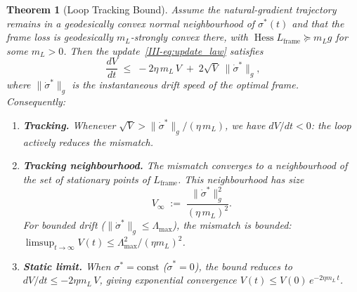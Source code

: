 \documentclass[12pt,a4paper,openany]{book}
\newtheorem{theorem}{Theorem}[chapter]
\begin{document}
\begin{theorem}[Loop Tracking Bound]
\label{III-thm:loop_stability}
Assume the natural-gradient trajectory remains in a geodesically convex
normal neighbourhood of $\sigma^*(t)$ and that the frame loss is
geodesically $m_L$-strongly convex there, with
$\operatorname{Hess}L_{\mathrm{frame}}\succeq m_L g$ for some
$m_L>0$.  Then the update~\eqref{III-eq:update_law} satisfies
\begin{equation}
\label{III-eq:lyapunov_decrease}
\frac{dV}{dt}
\;\leq\; -2\eta\,m_L\,V
\;+\; 2\sqrt{V}\;\bigl\|\dot{\sigma}^*\bigr\|_g,
\end{equation}
where $\|\dot{\sigma}^*\|_g$ is the instantaneous drift speed
of the optimal frame.
Consequently:
\begin{enumerate}
\item[\textup{(a)}] \textbf{Tracking.}
  Whenever $\sqrt{V} >
  \|\dot{\sigma}^*\|_g / (\eta\,m_L)$,
  we have $dV/dt < 0$: the loop actively reduces the
  mismatch.
\item[\textup{(b)}] \textbf{Tracking neighbourhood.}
  The mismatch converges to a neighbourhood of the set
  of stationary points of $L_{\mathrm{frame}}$.
  This neighbourhood has size
  \begin{equation}
  \label{III-eq:tracking_neighbourhood}
  V_\infty
  \;:=\; \frac{\bigl\|\dot{\sigma}^*\bigr\|_g^2}
  {(\eta\,m_L)^2}.
  \end{equation}
  For bounded drift
  ($\|\dot{\sigma}^*\|_g \leq \Lambda_{\max}$), the
  mismatch is bounded:
  $\limsup_{t\to\infty} V(t)
  \leq \Lambda_{\max}^2/(\eta m_L)^2$.
\item[\textup{(c)}] \textbf{Static limit.}
  When $\sigma^* = \mathrm{const}$
  ($\dot{\sigma}^* = 0$), the bound reduces to
  $dV/dt \leq -2\eta m_L\,V$,
  giving exponential convergence
  $V(t) \leq V(0)\,e^{-2\eta m_L\,t}$.
\end{enumerate}
\end{theorem}
\end{document}
